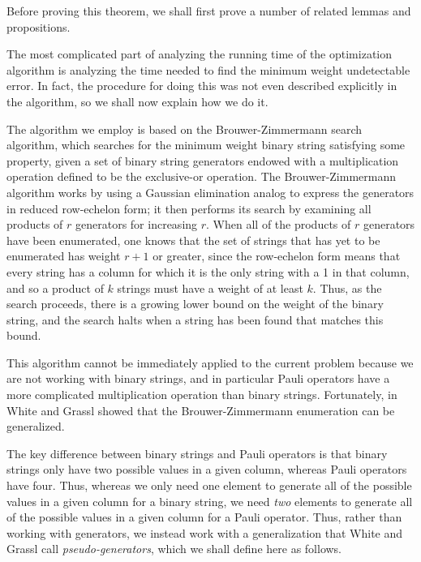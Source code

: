 \documentclass[twocolumn,showpacs,preprintnumbers,amsmath,amssymb,nofootinbib,pra,floatfix]{revtex4-1}
\newenvironment{remark}[1][Remark]{\begin{trivlist}
\item[\hskip \labelsep {\bfseries #1}]}{\end{trivlist}}
\begin{document}
\begin{remark}
Before proving this theorem, we shall first prove a number of related lemmas and propositions.

The most complicated part of analyzing the running time of the optimization algorithm is analyzing the time needed to find the minimum weight undetectable error.  In fact, the procedure for doing this was not even described explicitly in the algorithm, so we shall now explain how we do it.

The algorithm we employ is based on the Brouwer-Zimmermann search algorithm, which searches for the minimum weight binary string satisfying some property, given a set of binary string generators endowed with a multiplication operation defined to be the exclusive-or operation.  The Brouwer-Zimmermann algorithm works by using a Gaussian elimination analog to express the generators in reduced row-echelon form;  it then performs its search by examining all products of $r$ generators for increasing $r$.  When all of the products of $r$ generators have been enumerated, one knows that the set of strings that has yet to be enumerated has weight $r+1$ or greater, since the row-echelon form means that every string has a column for which it is the only string with a 1 in that column, and so a product of $k$ strings must have a weight of at least $k$.  Thus, as the search proceeds, there is a growing lower bound on the weight of the binary string, and the search halts when a string has been found that matches this bound.

This algorithm cannot be immediately applied to the current problem because we are not working with binary strings, and in particular Pauli operators have a more complicated multiplication operation than binary strings.  Fortunately, in~\cite{White:2006fj} White and Grassl showed that the Brouwer-Zimmermann enumeration can be generalized.

The key difference between binary strings and Pauli operators is that binary strings only have two possible values in a given column, whereas Pauli operators have four.  Thus, whereas we only need one element to generate all of the possible values in a given column for a binary string, we need \emph{two} elements to generate all of the possible values in a given column for a Pauli operator.  Thus, rather than working with generators, we instead work with a generalization that White and Grassl call \emph{pseudo-generators}, which we shall define here as follows.
\end{remark}
\end{document}
